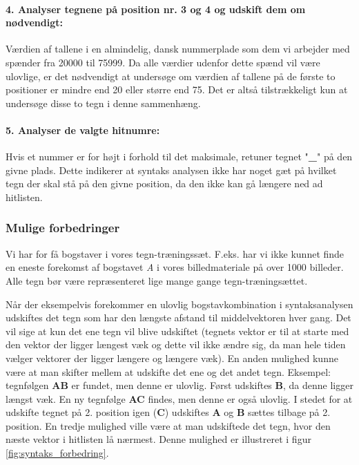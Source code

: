 \paragraph{4. Analyser tegnene på position nr. 3 og 4 og udskift dem om nødvendigt:}
Værdien af tallene i en almindelig, dansk nummerplade som dem vi arbejder med spænder fra 20000 til 75999. Da alle værdier udenfor dette spænd vil være ulovlige, er det nødvendigt at undersøge om værdien af tallene på de første to positioner er mindre end 20 eller større end 75. Det er altså tilstrækkeligt kun at undersøge disse to tegn i denne sammenhæng.

\paragraph{5. Analyser de valgte hitnumre:} Hvis et nummer er for højt i forhold til det maksimale, retuner tegnet "\textbf{\_}" på den givne plads. Dette indikerer at syntaks analysen ikke har noget gæt på hvilket tegn der skal stå på den givne position, da den ikke kan gå længere ned ad hitlisten.

\subsubsection{Mulige forbedringer}

Vi har for få bogstaver i vores tegn-træningssæt. F.eks. har vi ikke kunnet finde en eneste forekomst af bogstavet \textit{A} i vores billedmateriale på over 1000 billeder. Alle tegn bør være repræsenteret lige mange gange tegn-træningsættet.


Når der eksempelvis forekommer en ulovlig bogstavkombination i syntaksanalysen udskiftes det tegn som har den længste afstand til middelvektoren hver gang. Det vil sige at kun det ene tegn vil blive udskiftet (tegnets vektor er til at starte med den vektor der ligger længest væk og dette vil ikke ændre sig, da man hele tiden vælger vektorer der ligger længere og længere væk). En anden mulighed kunne være at man skifter mellem at udskifte det ene og det andet tegn. Eksempel: tegnfølgen \textbf{AB} er fundet, men denne er ulovlig. Først udskiftes \textbf{B}, da denne ligger længst væk. En ny tegnfølge \textbf{AC} findes, men denne er også ulovlig. I stedet for at udskifte tegnet på 2. position igen (\textbf{C}) udskiftes \textbf{A} og \textbf{B} sættes tilbage på 2. position. En tredje mulighed ville være at man udskiftede det tegn, hvor den næste vektor i hitlisten lå nærmest. Denne mulighed er illustreret i figur \vref{fig:syntaks_forbedring}.


